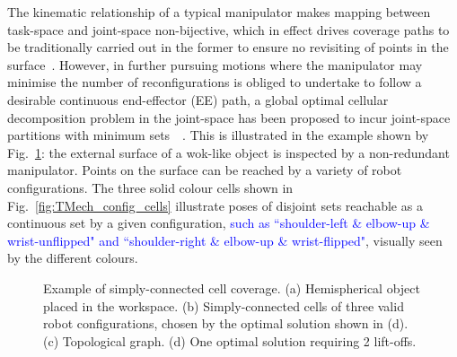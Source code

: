 \documentclass[Afour,sageh,times]{sagej}
\begin{document}
The kinematic relationship of a typical manipulator makes mapping between task-space and joint-space non-bijective, which in effect drives coverage paths to be traditionally carried out in the former to ensure no revisiting of points in the surface~\cite{Oriolo2005Motion}. 
However, in further pursuing motions where the manipulator may minimise the number of reconfigurations is obliged to undertake to follow a desirable continuous end-effector (EE) path, a global optimal cellular decomposition problem in the joint-space has been 
proposed to incur joint-space partitions with minimum sets~\cite{Yang2020Cellular}~\cite{Yang2020Nonrevisiting}. 
This is illustrated in the example shown by Fig.~\ref{fig:TMech}: the external surface of a wok-like object is inspected by a non-redundant manipulator. 
Points on the surface can be reached by a variety of robot configurations. 
The three solid colour cells shown in Fig.~\ref{fig:TMech_config_cells} illustrate poses of disjoint sets reachable as a continuous set by a given configuration, \textcolor{blue}{such as ``shoulder-left \&  elbow-up \& wrist-unflipped" and ``shoulder-right \&  elbow-up \& wrist-flipped"}, visually seen by the different colours. 
\begin{figure}[t]
\centering
{}
\caption{Example of simply-connected cell coverage. (a) Hemispherical object placed in the workspace. 
(b) Simply-connected cells of three valid robot configurations, chosen by the optimal solution shown in (d). 
(c) Topological graph. (d) One optimal solution requiring 2 lift-offs. 
}\label{fig:TMech}
\end{figure}
\end{document}
